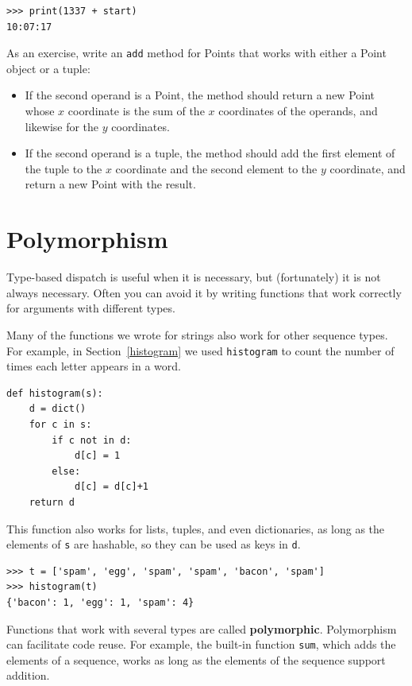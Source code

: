 \documentclass[10pt]{book}
\begin{document}
\begin{verbatim}
>>> print(1337 + start)
10:07:17
\end{verbatim}
%

As an exercise, write an {\tt add} method for Points that works with
either a Point object or a tuple:

\begin{itemize}

\item If the second operand is a Point, the method should return a new
Point whose $x$ coordinate is the sum of the $x$ coordinates of the
operands, and likewise for the $y$ coordinates.

\item If the second operand is a tuple, the method should add the
first element of the tuple to the $x$ coordinate and the second
element to the $y$ coordinate, and return a new Point with the result. 

\end{itemize}




\section{Polymorphism}
\label{polymorphism}

Type-based dispatch is useful when it is necessary, but (fortunately)
it is not always necessary.  Often you can avoid it by writing functions
that work correctly for arguments with different types.

Many of the functions we wrote for strings also
work for other sequence types.
For example, in Section~\ref{histogram}
we used {\tt histogram} to count the number of times each letter
appears in a word.

\begin{verbatim}
def histogram(s):
    d = dict()
    for c in s:
        if c not in d:
            d[c] = 1
        else:
            d[c] = d[c]+1
    return d
\end{verbatim}
%
This function also works for lists, tuples, and even dictionaries,
as long as the elements of {\tt s} are hashable, so they can be used
as keys in {\tt d}.

\begin{verbatim}
>>> t = ['spam', 'egg', 'spam', 'spam', 'bacon', 'spam']
>>> histogram(t)
{'bacon': 1, 'egg': 1, 'spam': 4}
\end{verbatim}
%
Functions that work with several types are called {\bf polymorphic}.
Polymorphism can facilitate code reuse.  For example, the built-in
function {\tt sum}, which adds the elements of a sequence, works
as long as the elements of the sequence support addition.
\end{document}

